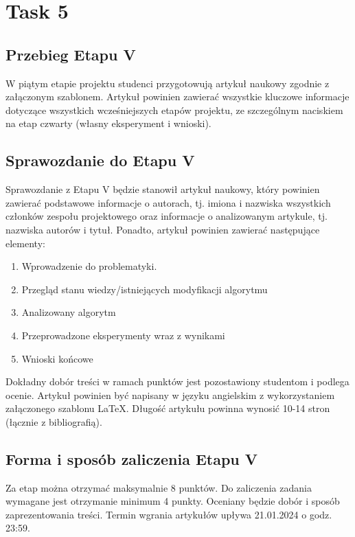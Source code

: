 \documentclass[a4paper]{LTJournalArticle}
\begin{document}
	\section{Task 5}
	\subsection{Przebieg Etapu V}
	W piątym etapie projektu studenci przygotowują artykuł naukowy zgodnie
	z załączonym szablonem.
	Artykuł powinien zawierać wszystkie kluczowe informacje dotyczące
	wszystkich wcześniejszych etapów projektu, ze szczególnym naciskiem na etap
	czwarty (własny eksperyment i wnioski).

	\subsection{Sprawozdanie do Etapu V}
	Sprawozdanie z Etapu V będzie stanowił artykuł naukowy, który powinien
	zawierać podstawowe informacje o autorach, tj. imiona i nazwiska wszystkich
	członków zespołu projektowego oraz informacje o analizowanym artykule, tj.
	nazwiska autorów i tytuł. Ponadto, artykuł powinien zawierać następujące
	elementy:
	\begin{enumerate}
		\item Wprowadzenie do problematyki.
		\item Przegląd stanu wiedzy/istniejących modyfikacji algorytmu
		\item Analizowany algorytm
		\item Przeprowadzone eksperymenty wraz z wynikami
		\item Wnioski końcowe
	\end{enumerate}
	Dokładny dobór treści w ramach punktów jest pozostawiony studentom
	i podlega ocenie.
	Artykuł powinien być napisany w języku angielskim z wykorzystaniem
	załączonego szablonu LaTeX. Długość artykułu powinna wynosić 10-14 stron
	(łącznie z bibliografią).

	\subsection{Forma i sposób zaliczenia Etapu V}
	Za etap można otrzymać maksymalnie 8 punktów. Do zaliczenia zadania
	wymagane jest otrzymanie minimum 4 punkty. Oceniany będzie dobór i sposób
	zaprezentowania treści. Termin wgrania artykułów upływa 21.01.2024 o godz.
	23:59.

	
	\printbibliography %
	
	
\end{document}
